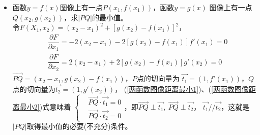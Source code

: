 \begin{itemize}[leftmargin=\inteval{\myitemleftmargin}pt,itemsep=
   \inteval{\myitemitempsep}pt,topsep=\inteval{\myitemtopsep}pt]
\item 函数$ y=f(x) $图像上有一点$ P(x_1,f(x_1)) $，函数$ y=g(x) $
图像上有一点$ Q(x_2,g(x_2)) $，求$ |PQ| $的最小值。\\
令$ F(X_1,x_2)=(x_2-x_1)^2+[g(x_2)-f(x_1)]^2 $，
\begin{align}
    & \dfrac{\partial F}{\partial x_1}=-2(x_2-x_1)-2[g(x_2)-f(x_1)]f'(x_1)=0 
    \label{两函数图像距离最小1}  \\
    & \dfrac{\partial F}{\partial x_2}=2(x_2-x_1)+2[g(x_2)-f(x_1)]g'(x_2)=0
    \label{两函数图像距离最小2}
\end{align}
$ \vec{PQ}=(x_2-x_1,g(x_2)-f(x_1)) $，$ P $点的切向量为
$ \vec{t_1}=(1,f'(x_1)) $，$ Q $点的切向量为$ \vec{t_2}=(1,g'(x_2)) $，
(\ref{两函数图像距离最小1})、(\ref{两函数图像距离最小2})式意味着
$  \begin{cases}
    & \vec{PQ}\cdot \vec{t_1} =0 \\
    & \vec{PQ}\cdot \vec{t_2} =0
\end{cases} $，即$ \vec{PQ}\perp\vec{t_1},\ \vec{PQ}\perp\vec{t_2} $，
$ \vec{t_1}//\vec{t_2} $，这就是$ |PQ| $取得最小值的必要(不充分)条件。


\end{itemize}
